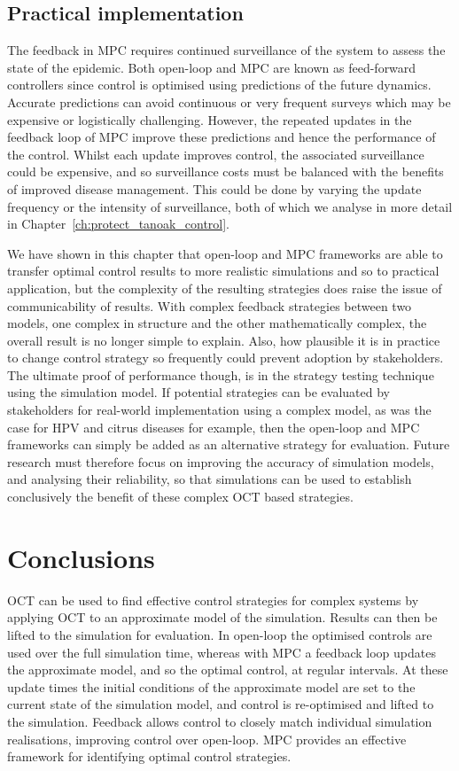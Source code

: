 \subsection{Practical implementation}

The feedback in MPC requires continued surveillance of the system to assess the state of the epidemic. Both open-loop and MPC are known as feed-forward controllers since control is optimised using predictions of the future dynamics. Accurate predictions can avoid continuous or very frequent surveys which may be expensive or logistically challenging. However, the repeated updates in the feedback loop of MPC improve these predictions and hence the performance of the control. Whilst each update improves control, the associated surveillance could be expensive, and so surveillance costs must be balanced with the benefits of improved disease management. This could be done by varying the update frequency or the intensity of surveillance, both of which we analyse in more detail in Chapter~\ref{ch:protect_tanoak_control}.

We have shown in this chapter that open-loop and MPC frameworks are able to transfer optimal control results to more realistic simulations and so to practical application, but the complexity of the resulting strategies does raise the issue of communicability of results. With complex feedback strategies between two models, one complex in structure and the other mathematically complex, the overall result is no longer simple to explain. Also, how plausible it is in practice to change control strategy so frequently could prevent adoption by stakeholders. The ultimate proof of performance though, is in the strategy testing technique using the simulation model. If potential strategies can be evaluated by stakeholders for real-world implementation using a complex model, as was the case for HPV \citep{choi_transmission_2010} and citrus diseases \citep{cunniffe_optimising_2015} for example, then the open-loop and MPC frameworks can simply be added as an alternative strategy for evaluation. Future research must therefore focus on improving the accuracy of simulation models, and analysing their reliability, so that simulations can be used to establish conclusively the benefit of these complex OCT based strategies.

\section{Conclusions}

OCT can be used to find effective control strategies for complex systems by applying OCT to an approximate model of the simulation. Results can then be lifted to the simulation for evaluation. In open-loop the optimised controls are used over the full simulation time, whereas with MPC a feedback loop updates the approximate model, and so the optimal control, at regular intervals. At these update times the initial conditions of the approximate model are set to the current state of the simulation model, and control is re-optimised and lifted to the simulation. Feedback allows control to closely match individual simulation realisations, improving control over open-loop. MPC provides an effective framework for identifying optimal control strategies.
